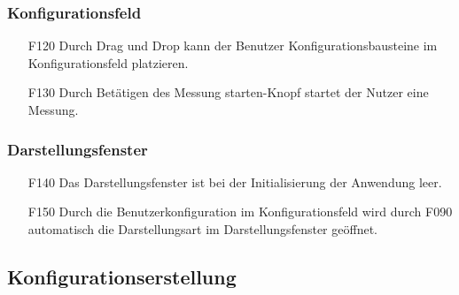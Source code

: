 \documentclass[parskip=full]{scrartcl}
\begin{document}
\subsubsection{Konfigurationsfeld}

\begin{itemize}
\item[F120] Durch Drag und Drop kann der Benutzer Konfigurationsbausteine im Konfigurationsfeld platzieren.
\item[F130] Durch Betätigen des Messung starten-Knopf startet der Nutzer eine Messung.
\end{itemize}


\subsubsection{Darstellungsfenster}

\begin{itemize}
\item[F140] Das Darstellungsfenster ist bei der Initialisierung der Anwendung leer.
\item[F150] Durch die Benutzerkonfiguration im Konfigurationsfeld wird durch F090 automatisch die Darstellungsart im Darstellungsfenster geöffnet.
\end{itemize}



\subsection{Konfigurationserstellung}
\end{document}
